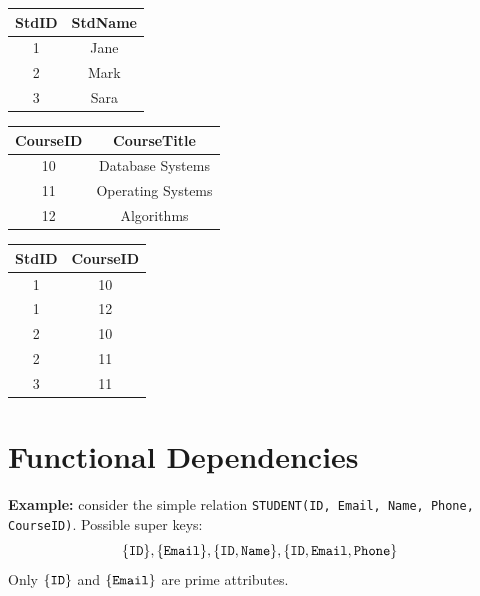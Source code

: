 \documentclass{article}
\begin{document}
\begin{center}
    \begin{tabular}{|c|c|}
    \hline
    \textbf{StdID} & StdName \\
    \hline
    1 & Jane \\
    2 & Mark \\
    3 & Sara \\
    \hline
    \end{tabular}
    \quad
    \begin{tabular}{|c|c|}
    \hline
    \textbf{CourseID} & CourseTitle \\
    \hline
    10 & Database Systems \\
    11 & Operating Systems \\
    12 & Algorithms \\
    \hline
    \end{tabular}
    \quad
    \begin{tabular}{|c|c|}
    \hline
    \textbf{StdID} & \textbf{CourseID} \\
    \hline
    1 & 10 \\
    1 & 12 \\
    2 & 10 \\
    2 & 11 \\
    3 & 11 \\
    \hline
    \end{tabular}
    \end{center}

\newpage
\section{Functional Dependencies}


\textbf{Example: }consider the simple relation \texttt{STUDENT(ID, Email, Name, Phone, CourseID)}. Possible super keys:
\[
\{\texttt{ID}\}, \{\texttt{Email}\}, \{\texttt{ID}, \texttt{Name}\}, \{\texttt{ID}, \texttt{Email}, \texttt{Phone}\}
\]
Only $\{\texttt{ID}\}$ and $\{\texttt{Email}\}$ are prime attributes.


\end{document}
